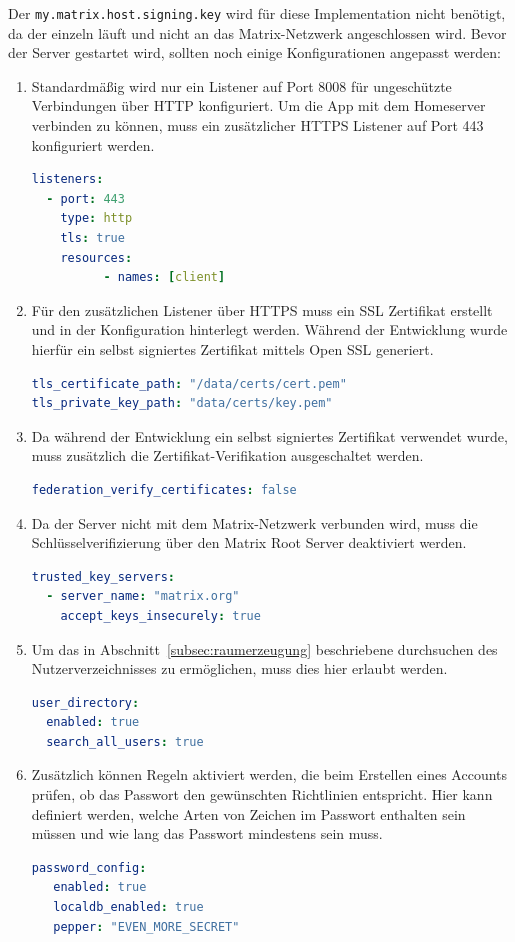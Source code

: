     Der \texttt{my.matrix.host.signing.key} wird für diese Implementation nicht benötigt, da der einzeln läuft und nicht an das Matrix-Netzwerk angeschlossen wird.
    Bevor der Server gestartet wird, sollten noch einige Konfigurationen angepasst werden:
    \begin{enumerate}[label={(\arabic*)}]
        \item Standardmäßig wird nur ein Listener auf Port 8008 für ungeschützte Verbindungen über HTTP konfiguriert.
            Um die App mit dem Homeserver verbinden zu können, muss ein zusätzlicher HTTPS Listener auf Port 443 konfiguriert werden.
        \begin{lstlisting}[language=yaml,label={lst:listener}]
listeners:
  - port: 443
    type: http
    tls: true
    resources:
          - names: [client]
            \end{lstlisting}
        \item Für den zusätzlichen Listener über HTTPS muss ein SSL Zertifikat erstellt und in der Konfiguration hinterlegt werden. Während der Entwicklung wurde hierfür ein selbst signiertes Zertifikat mittels Open SSL generiert.
            \begin{lstlisting}[language=yaml,label={lst:ssl-certificate}]
tls_certificate_path: "/data/certs/cert.pem"
tls_private_key_path: "data/certs/key.pem"
            \end{lstlisting}
        \item Da während der Entwicklung ein selbst signiertes Zertifikat verwendet wurde, muss zusätzlich die Zertifikat-Verifikation ausgeschaltet werden.
            \begin{lstlisting}[language=yaml,label={lst:disable-cert}]
federation_verify_certificates: false
            \end{lstlisting}
        \item Da der Server nicht mit dem Matrix-Netzwerk verbunden wird, muss die Schlüsselverifizierung über den Matrix Root Server deaktiviert werden.
            \begin{lstlisting}[language=yaml,label={lst:disable-key-verification}]
trusted_key_servers:
  - server_name: "matrix.org"
    accept_keys_insecurely: true
            \end{lstlisting}
        \item Um das in Abschnitt~\ref{subsec:raumerzeugung} beschriebene durchsuchen des Nutzerverzeichnisses zu ermöglichen, muss dies hier erlaubt werden.
            \begin{lstlisting}[language=yaml,label={lst:user-directory}]
user_directory:
  enabled: true
  search_all_users: true
            \end{lstlisting}
        \item Zusätzlich können Regeln aktiviert werden, die beim Erstellen eines Accounts prüfen, ob das Passwort den gewünschten Richtlinien entspricht.
                Hier kann definiert werden, welche Arten von Zeichen im Passwort enthalten sein müssen und wie lang das Passwort mindestens sein muss.
            \begin{lstlisting}[language=yaml,label={lst:password-policy}]
password_config:
   enabled: true
   localdb_enabled: true
   pepper: "EVEN_MORE_SECRET"


\end{lstlisting}
\end{enumerate}
